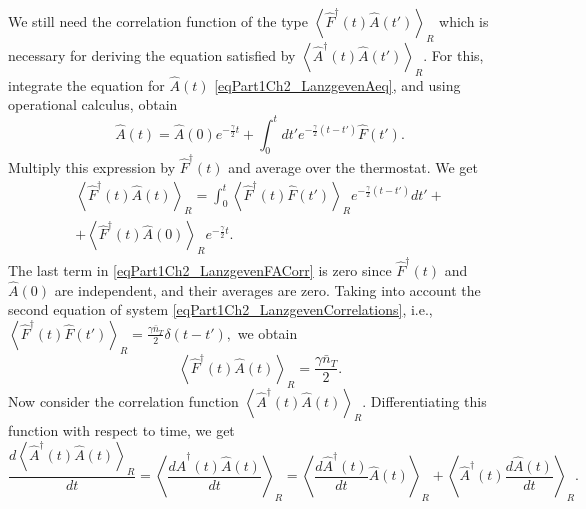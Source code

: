 We still need the correlation function of the type
\(
\left<\hat{F}^{\dag}\left(t\right)\hat{A}\left(t'\right)\right>_R 
\) 
which is necessary for deriving the equation satisfied by 
\(
\left<\hat{A}^{\dag}\left(t\right)\hat{A}\left(t'\right)\right>_R 
\). For this, integrate the equation for $\hat{A}\left(t\right)$
\eqref{eqPart1Ch2_LanzgevenAeq}, and using operational calculus, obtain
\begin{equation} 
\hat{A}\left(t\right) = \hat{A}\left(0\right)e^{-\frac{\gamma}{2}t} +
\int_0^t d t' e^{-\frac{\gamma}{2}\left(t - t'\right)} \hat{F}\left(t'\right).
\nonumber
\end{equation} 
Multiply this expression by $\hat{F}^{\dag}\left(t\right)$ and average over the thermostat. We get
\begin{eqnarray} 
\left<\hat{F}^{\dag}\left(t\right)\hat{A}\left(t\right)\right>_R = 
\int_0^t  
\left<\hat{F}^{\dag}\left(t\right)\hat{F}\left(t'\right)\right>_R 
e^{-\frac{\gamma}{2}\left(t - t'\right)}
d t' +
\nonumber \\
+ \left<\hat{F}^{\dag}\left(t\right)\hat{A}\left(0\right)\right>_R e^{-\frac{\gamma}{2}t}.
\label{eqPart1Ch2_LanzgevenFACorr}
\end{eqnarray} 
The last term in \eqref{eqPart1Ch2_LanzgevenFACorr} is zero since 
$\hat{F}^{\dag}\left(t\right)$ and $\hat{A}\left(0\right)$ are independent,
and their averages are zero. Taking into account the second equation of system 
\eqref{eqPart1Ch2_LanzgevenCorrelations}, i.e.,
\(
\left<\hat{F}^{\dag}\left(t\right)\hat{F}\left(t'\right)\right>_R = 
\frac{\gamma \bar{n}_{T}}{2} \delta\left(t - t'\right),
\)
we obtain
\begin{equation}
\left<\hat{F}^{\dag}\left(t\right)\hat{A}\left(t\right)\right>_R = 
\frac{\gamma \bar{n}_{T}}{2}.
\nonumber
\end{equation}
Now consider the correlation function 
\(
\left<\hat{A}^{\dag}\left(t\right)\hat{A}\left(t\right)\right>_R
\). Differentiating this function with respect to time, we get
\begin{equation}
\frac{d \left<\hat{A}^{\dag}\left(t\right)\hat{A}\left(t\right)\right>_R}{d
t}=
\left<\frac{d \hat{A}^{\dag}\left(t\right)\hat{A}\left(t\right)}{d
t}\right>_R =
\left<\frac{d \hat{A}^{\dag}\left(t\right)}{d
t} \hat{A}\left(t\right) \right>_R + 
\left<\hat{A}^{\dag}\left(t\right)\frac{d \hat{A}\left(t\right)}{d
t}  \right>_R.
\label{eqPart1Ch2_Lanzgeven_dAA}
\end{equation}
